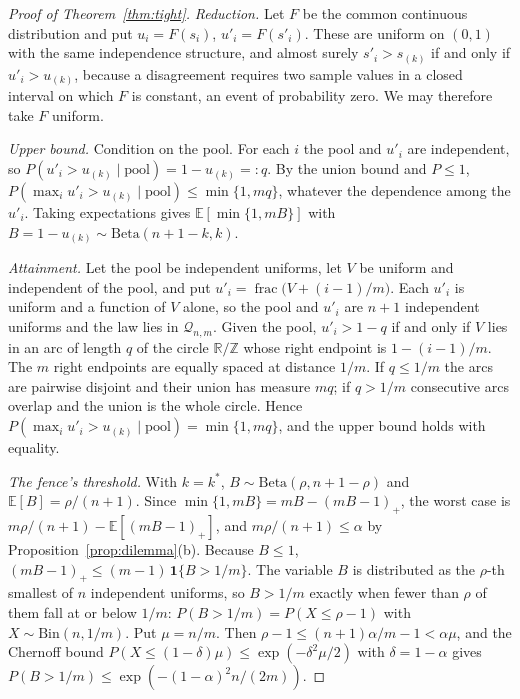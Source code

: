 \begin{proof}[Proof of Theorem~\ref{thm:tight}]
\emph{Reduction.} Let $F$ be the common continuous distribution and put $u_i=F(s_i)$, $u'_i=F(s'_i)$. These are uniform on $(0,1)$ with the same independence structure, and almost surely $s'_i>s_{(k)}$ if and only if $u'_i>u_{(k)}$, because a disagreement requires two sample values in a closed interval on which $F$ is constant, an event of probability zero. We may therefore take $F$ uniform.

\emph{Upper bound.} Condition on the pool. For each $i$ the pool and $u'_i$ are independent, so $P(u'_i>u_{(k)}\mid\text{pool})=1-u_{(k)}=:q$. By the union bound and $P\le1$, $P(\max_iu'_i>u_{(k)}\mid\text{pool})\le\min\{1,mq\}$, whatever the dependence among the $u'_i$. Taking expectations gives $\mathbb{E}[\min\{1,mB\}]$ with $B=1-u_{(k)}\sim\mathrm{Beta}(n+1-k,k)$.

\emph{Attainment.} Let the pool be independent uniforms, let $V$ be uniform and independent of the pool, and put $u'_i=\operatorname{frac}\big(V+(i-1)/m\big)$. Each $u'_i$ is uniform and a function of $V$ alone, so the pool and $u'_i$ are $n+1$ independent uniforms and the law lies in $\mathcal{Q}_{n,m}$. Given the pool, $u'_i>1-q$ if and only if $V$ lies in an arc of length $q$ of the circle $\mathbb{R}/\mathbb{Z}$ whose right endpoint is $1-(i-1)/m$. The $m$ right endpoints are equally spaced at distance $1/m$. If $q\le1/m$ the arcs are pairwise disjoint and their union has measure $mq$; if $q>1/m$ consecutive arcs overlap and the union is the whole circle. Hence $P(\max_iu'_i>u_{(k)}\mid\text{pool})=\min\{1,mq\}$, and the upper bound holds with equality.

\emph{The fence's threshold.} With $k=k^\ast$, $B\sim\mathrm{Beta}(\rho,n+1-\rho)$ and $\mathbb{E}[B]=\rho/(n+1)$. Since $\min\{1,mB\}=mB-(mB-1)_+$, the worst case is $m\rho/(n+1)-\mathbb{E}[(mB-1)_+]$, and $m\rho/(n+1)\le\alpha$ by Proposition~\ref{prop:dilemma}(b). Because $B\le1$, $(mB-1)_+\le(m-1)\,\mathbf{1}\{B>1/m\}$. The variable $B$ is distributed as the $\rho$-th smallest of $n$ independent uniforms, so $B>1/m$ exactly when fewer than $\rho$ of them fall at or below $1/m$: $P(B>1/m)=P(X\le\rho-1)$ with $X\sim\mathrm{Bin}(n,1/m)$. Put $\mu=n/m$. Then $\rho-1\le(n+1)\alpha/m-1<\alpha\mu$, and the Chernoff bound $P(X\le(1-\delta)\mu)\le \exp(-\delta^2\mu/2)$ with $\delta=1-\alpha$ gives $P(B>1/m)\le\exp(-(1-\alpha)^2n/(2m))$.
\end{proof}

